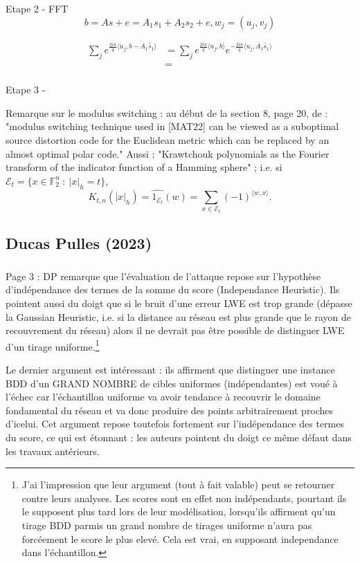 \documentclass{article}
\begin{document}
Etape 2 - FFT
\[b = As +e = A_1 s_1 + A_2 s_2 + e , w_j = (u_j , v_j)\]



\[\begin{split}
\sum_{j} e^{\frac{2i\pi}{q}\langle u_j , b - A_1\tilde{s_1} \rangle} 
	& = \sum_j e^{\frac{2i\pi}{q}\langle u_j , b\rangle }e^{ - \frac{2i\pi}{q}\langle u_j ,A_1\tilde{s_1} \rangle}\\
	& = \\
\end{split}\]

Etape 3 - 

Remarque sur le modulus switching : au début de la section 8, page 20, de \cite{carrier2024reduction} : "modulus switching technique used in [MAT22] can be viewed as a suboptimal
source distortion code for the Euclidean metric which can be replaced by an almost optimal polar code."
Aussi : "Krawtchouk polynomials as the Fourier transform of the indicator function of a Hamming sphere" ; i.e. si $\mathcal E_t = \{x \in \mathbb F_2^n\ : \ |x|_{h} = t\}$, 
\[K_{t,n}(|x|_h)  = \hat{1_{\mathcal E_t}} (w) = \sum_{x\in \mathcal E_t} (-1)^{\langle w,x \rangle}.\]
\subsection{Ducas Pulles (2023)}%

\subsubsection{} Page 3 : DP remarque que l'évaluation de l'attaque repose sur l'hypothèse d'indépendance des termes de la somme du score (Independance Heuristic). Ils pointent aussi du doigt que si le bruit d'une erreur LWE est trop grande (dépasse la Gaussian Heuristic, i.e. si la distance au réseau est plus grande que le rayon de recouvrement du réseau) alors il ne devrait pas être possible de distinguer LWE d'un tirage uniforme.\footnote{J'ai l'impression que leur argument (tout à fait valable) peut se retourner contre leurs analyses. Les scores sont en effet non indépendants, pourtant ils le supposent plus tard lors de leur modélisation, lorsqu'ils affirment qu'un tirage BDD parmis un grand nombre de tirages uniforme n'aura pas forcéement le score le plus elevé. Cela est vrai, en supposant independance dans l'échantillon.}

Le dernier argument est intéressant : ils affirment que distinguer une instance BDD d'un GRAND NOMBRE de cibles uniformes (indépendantes) est voué à l'échec car l'échantillon uniforme va avoir tendance à recouvrir le domaine fondamental du réseau et va donc produire des points arbitrairement proches d'icelui. Cet argument repose toutefois fortement sur l'indépendance des termes du score, ce qui est étonnant : les auteurs pointent du doigt ce même défaut dans les travaux antérieurs.   
\end{document}
